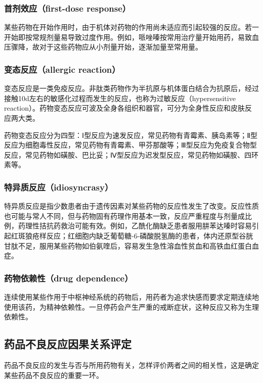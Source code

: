 \subsubsection{首剂效应（first-dose response）}

某些药物在开始作用时，由于机体对药物的作用尚未适应而引起较强的反应。若一开始即按常规剂量易导致过度作用。例如，哌唑嗪按常用治疗量开始用药，易致血压骤降，故对于这些药物应从小剂量开始，逐渐加量至常用量。

\subsubsection{变态反应（allergic reaction）}

变态反应是一类免疫反应。非肽类药物作为半抗原与机体蛋白结合为抗原后，经过接触10d左右的敏感化过程而发生的反应，也称为过敏反应（hypersensitive
reaction）。药物变态反应可波及全身各组织和器官，可分为全身性反应和皮肤反应两大类。

药物变态反应分为四型：Ⅰ型反应为速发反应，常见药物有青霉素、胰岛素等；Ⅱ型反应为细胞毒性反应，常见药物有青霉素、甲芬那酸等；Ⅲ型反应为免疫复合物型反应，常见药物如磺胺、巴比妥；Ⅳ型反应为迟发型反应，常见药物如磺胺、四环素等。

\subsubsection{特异质反应（idiosyncrasy）}

特异质反应是指少数患者由于遗传因素对某些药物的反应性发生了改变。反应性质也可能与常人不同，但与药物固有药理作用基本一致，反应严重程度与剂量成比例，药理性拮抗药救治可能有效。例如，乙酰化酶缺乏患者服用肼苯达嗪时容易引起红斑狼疮样反应；红细胞内缺乏葡萄糖-6-磷酸脱氢酶的患者，体内还原型谷胱甘肽不足，服用某些药物如伯氨喹后，容易发生急性溶血性贫血和高铁血红蛋白血症。

\subsubsection{药物依赖性（drug dependence）}

连续使用某些作用于中枢神经系统的药物后，用药者为追求快感而要求定期连续地使用该药，为精神依赖性。一旦停药会产生严重的戒断症状，这种反应又称为生理依赖性。

\subsection{药品不良反应因果关系评定}

药品不良反应的发生与否与所用药物有关，怎样评价两者之间的相关性，这是确定某些药品不良反应的重要一环。

